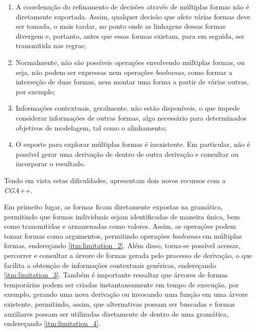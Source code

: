 \begin{enumerate}
    \item \label{itm:limitation_1} A coordenação do refinamento de decisões através de múltiplas formas não é diretamente suportada. Assim, qualquer decisão que afete várias formas deve ser tomada, o mais tardar, no ponto onde as linhagens dessas formas divergem e, portanto, antes que essas formas existam, para em seguida, ser transmitida nas regras;

    \item \label{itm:limitation_2} Normalmente, não são possíveis operações envolvendo múltiplas formas, ou seja, não podem ser expressas nem operações \textit{booleanas}, como formar a interseção de duas formas, nem montar uma forma a partir de várias outras, por exemplo;

    \item \label{itm:limitation_3} Informações contextuais, geralmente, não estão disponíveis, o que impede considerar informações de outras formas, algo necessário para determinados objetivos de modelagem, tal como o alinhamento;

    \item \label{itm:limitation_4} O suporte para explorar múltiplas formas é inexistente. Em particular, não é possível gerar uma derivação de dentro de outra derivação e consultar ou incorporar o resultado.
\end{enumerate}

\vspace{0.5cm}

Tendo em vista estas dificuldades,  apresentam dois novos recursos com a \textit{CGA++}. 

Em primeito lugar, as formas ficam diretamente expostas na gramática, permitindo que formas individuais sejam identificadas de maneira única, bem como transmitidas e armazenadas como valores. Assim, as operações podem tomar formas como argumentos, permitindo operações \textit{booleanas} em múltiplas formas, endereçando \ref{itm:limitation_2}. Além disso, torna-se possível acessar, percorrer e consultar a árvore de formas gerada pelo processo de derivação, o que facilita a obtenção de informações contextuais genéricas, endereçando \ref{itm:limitation_3}. Também é importante ressaltar que árvores de formas temporárias podem ser criadas instantaneamente em tempo de execução, por exemplo, gerando uma nova derivação ou invocando uma função em uma árvore existente, permitindo, assim, que alternativas possam ser buscadas e formas auxiliares possam ser utilizadas diretamente de dentro de uma gramática, endereçando \ref{itm:limitation_4}. 

